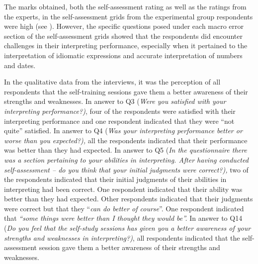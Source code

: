 \documentclass[output=paper]{langsci/langscibook}
\begin{document}
The marks obtained, both the self-assessment rating as well as the ratings from the experts, in the self-assessment grids from the experimental group respondents were high (see ). However, the specific questions posed under each macro error section of the self-assessment grids showed that the respondents did encounter challenges in their interpreting performance, especially when it pertained to the interpretation of idiomatic expressions and accurate interpretation of numbers and dates.  

In the qualitative data from the interviews, it was the perception of all respondents that the self-training sessions gave them a better awareness of their strengths and weaknesses. In answer to Q3 (\textit{Were you satisfied with your interpreting performance?)}, four of the respondents were satisfied with their interpreting performance and one respondent indicated that they were “not quite” satisfied. In answer to Q4 (\textit{Was your interpreting performance better or worse than you expected?),} all the respondents indicated that their performance was better than they had expected. In answer to Q5 (\textit{In the questionnaire there was a section pertaining to your abilities in interpreting. After having conducted self-assessment – do you think that your initial judgments were correct?),} two of the respondents indicated that their initial judgments of their abilities in interpreting had been correct. One respondent indicated that their ability was better than they had expected. Other respondents indicated that their judgments were correct but that they “\textit{can do better of course}”. One respondent indicated that \textit{“some things were better than I thought they would be”.} In answer to Q14 (\textit{Do you feel that the self-study sessions has given you a better awareness of your strengths and weaknesses in interpreting?)}, all respondents indicated that the self-assessment session gave them a better awareness of their strengths and weaknesses. 
\end{document}

